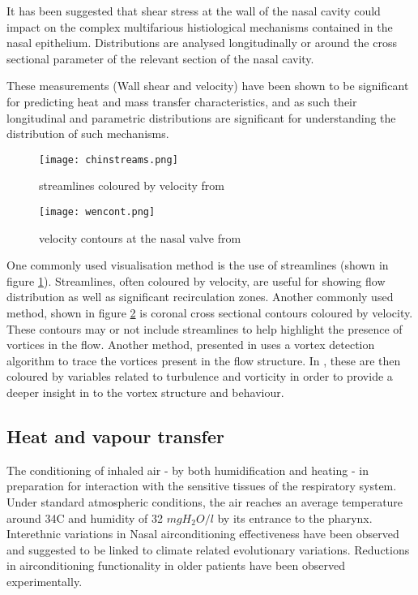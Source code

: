 It has been suggested that shear stress at the wall of the nasal cavity could impact on the complex multifarious histiological mechanisms contained in the nasal epithelium\cite{Elad2006}.
Distributions are analysed longitudinally\cite{Wen2008} or around the cross sectional parameter of the relevant section of the nasal cavity\cite{Burgos2014}. 

These measurements (Wall shear and velocity) have been shown to be significant for predicting heat and mass transfer characteristics\cite{Taylor2010}, and as such their longitudinal and parametric distributions are significant for understanding the distribution of such mechanisms. 

\begin{figure}
  \centering
  \texttt{[image: chinstreams.png]}
  \caption{streamlines coloured by velocity from \cite{Tan2012}} \label{fig:chinstreams}
\centering
\end{figure}

\begin{figure}
  \centering
  \texttt{[image: wencont.png]}
  \caption{velocity contours at the nasal valve from \cite{Wen2008}} \label{fig:wencont}
\centering
\end{figure}

One commonly used visualisation method is the use of streamlines (shown in figure \ref{fig:chinstreams}). Streamlines, often coloured by velocity\cite{Wen2008, Zhu2011, Garcia2007}, are useful for showing flow distribution as well as significant recirculation zones\cite{Lintermann2013, Xi2014}. Another commonly used method, shown in figure \ref{fig:wencont} is coronal cross sectional contours coloured by velocity. These contours may or not include streamlines to help highlight the presence of vortices in the flow\cite{Wen2008}. Another method, presented in \cite{Lintermann2013} uses a vortex detection algorithm to trace the vortices present in the flow structure. In \cite{Lintermann2013}, these are then coloured by variables related to turbulence and vorticity in order to provide a deeper insight in to the vortex structure and behaviour.

\subsection{Heat and vapour transfer}

The conditioning of inhaled air - by both humidification and heating - in preparation for interaction with the sensitive tissues of the respiratory system\cite{Elad2008}.
Under standard atmospheric conditions, the air reaches an average temperature around 34\degree C and humidity of 32 $mg H_2 O/l$ by its entrance to the pharynx\cite{Keck2000}.
Interethnic variations in Nasal airconditioning effectiveness have been observed and suggested to be linked to climate related evolutionary variations\cite{Noback2011, Yokley2009}.
Reductions in airconditioning functionality in older patients have been observed experimentally\cite{Lindemann2008}.

